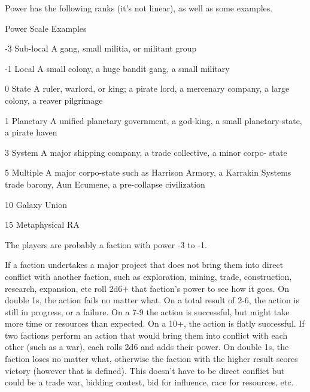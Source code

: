 Power has the following ranks (it’s not linear), as well as some examples.  

            Power      Scale             Examples 

            -3         Sub-local        A gang, small militia, or militant group 

            -1         Local            A small colony, a huge bandit gang, a small military 

            0          State            A ruler, warlord, or king; a pirate lord, a mercenary company,  
                                        a large colony, a reaver pilgrimage 

            1          Planetary        A unified planetary government, a god-king, a small  
                                         planetary-state, a pirate haven 

            3          System           A major shipping company, a trade collective, a minor corpo- 
                                        state 

            5          Multiple         A major corpo-state such as Harrison Armory, a Karrakin  
                       Systems          trade barony, Aun Ecumene, a pre-collapse civilization 

            10         Galaxy            Union 

            15         Metaphysical      RA 

The players are probably a faction with power -3 to -1.  

                                                                                                          


If a faction undertakes a major project that does not bring them into direct conflict with another  
faction, such as exploration, mining, trade, construction, research, expansion, etc roll 2d6+ that  
faction’s power to see how it goes. On double 1s, the action fails no matter what. On a total result  
of 2-6, the action is still in progress, or a failure. On a 7-9 the action is successful, but might take  
more time or resources than expected. On a 10+, the action is flatly successful.  
If two factions perform an action that would bring them into conflict with each other (such  
as a war), each rolls 2d6 and adds their power. On double 1s, the faction loses no matter what,  
otherwise the faction with the higher result scores victory (however that is defined). This doesn’t  
have to be direct conflict but could be a trade war, bidding contest, bid for influence, race for  
resources, etc.  

